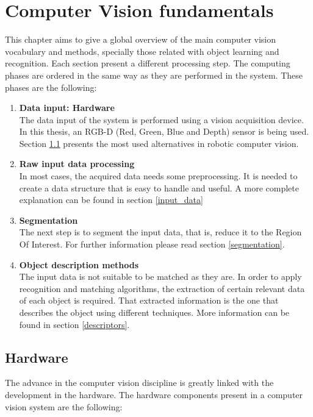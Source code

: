 \chapter{Computer Vision fundamentals}
This chapter aims to give a global overview of the main computer vision vocabulary and methods, specially those related with object learning and recognition. 
Each section present a different processing step. 
The computing phases are ordered in the same way as they are performed in the system. 
These phases are the following: 
\begin {enumerate}
	\item{\textbf{Data input: Hardware} \\}
	The data input of the system is performed using a vision acquisition device. 
	In this thesis, an RGB-D (Red, Green, Blue and Depth) sensor is being used. 
	Section \ref{hardware} presents the most used alternatives in robotic computer vision. 

	\item{\textbf{Raw input data processing}\\}
	In most cases, the acquired data needs some preprocessing. 
	It is needed to create a data structure that is easy to handle and useful. 
	A more complete explanation can be found in section \ref{input_data}

	\item{\textbf{Segmentation}\\}
	The next step is to segment the input data, that is, reduce it to the Region Of Interest. 
	For further information please read section \ref{segmentation}.

	\item{\textbf{Object description methods}\\}
	The input data is not suitable to be matched as they are. 
	In order to apply recognition and matching algorithms, the extraction of certain relevant data of each object is required. 
	That extracted information is the one that describes the object using different techniques. 
	More information can be found in section \ref{descriptors}.
\end{enumerate}


\section{Hardware}
\label{hardware}
The advance in the computer vision discipline is greatly linked with the development in the hardware. 
The hardware components present in a computer vision system are the following: 

